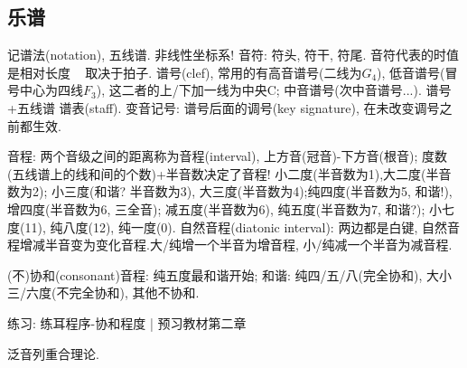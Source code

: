 \documentclass{article}
\begin{document}
\subsection{乐谱}
    
    记谱法(notation), 五线谱. 非线性坐标系! 音符: 符头, 符干, 符尾. 音符代表的时值是相对长度 ~ 取决于拍子. 谱号(clef), 常用的有高音谱号(二线为$G_4$), 低音谱号(冒号中心为四线$F_3$), 这二者的上/下加一线为中央C; 中音谱号(次中音谱号...). 谱号+五线谱 \trarr 谱表(staff). 
    变音记号: 谱号后面的调号(key signature), 在未改变调号之前都生效.

    音程: 两个音级之间的距离称为音程(interval), 上方音(冠音)-下方音(根音); 度数(五线谱上的线和间的个数)+半音数决定了音程! 小二度(半音数为1),大二度(半音数为2); 小三度(和谐? 半音数为3), 大三度(半音数为4);纯四度(半音数为5, 和谐!), 增四度(半音数为6, 三全音); 减五度(半音数为6), 纯五度(半音数为7, 和谐?); 小七度(11), 纯八度(12), 纯一度(0). 自然音程(diatonic interval): 两边都是白键, 自然音程增减半音变为变化音程.大/纯增一个半音为增音程, 小/纯减一个半音为减音程. 
    
    (不)协和(consonant)音程: 纯五度最和谐开始; 和谐: 纯四/五/八(完全协和), 大小三/六度(不完全协和), 其他不协和.
    
    练习: 练耳程序-协和程度 | 预习教材第二章

    泛音列重合理论.
\end{document}
